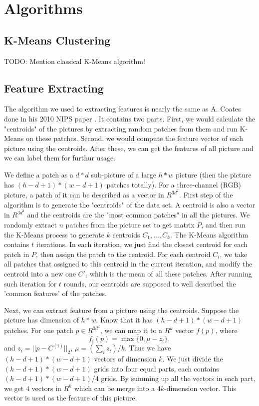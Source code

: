 \documentclass[12pt,abstract=true]{scrartcl}
\numberwithin{equation}{section}
\theoremstyle{definition}   \newtheorem{definition}{Definition}[section]
\theoremstyle{plain}        \newtheorem{theorem}{Theorem}[section]
\theoremstyle{plain}        \newtheorem{observation}{Observation}[section]
\theoremstyle{plain}        \newtheorem{fact}{Fact}[section]
\theoremstyle{plain}        \newtheorem{claim}{Claim}[section]
\theoremstyle{plain}        \newtheorem{lemma}[theorem]{Lemma}
\theoremstyle{plain}        \newtheorem{corollary}[theorem]{Corollary}
\theoremstyle{remark}       \newtheorem{example}{Example}[section]
\theoremstyle{remark}       \newtheorem{remark}{Remark}[section]
\begin{document}
\section{Algorithms}

	\subsection{K-Means Clustering}
		{\color{red}TODO: Mention classical K-Means algorithm!}
	
	\subsection{Feature Extracting}
		The algorithm we used to extracting features is nearly the same
			as A. Coates done in his 2010 NIPS paper \cite{singlelayer}.
		It contains two parts.
		First, we would calculate the "centroids" of the pictures by extracting
			random patches from them and run K-Means on these patches.
		Second, we would compute the feature vector of each picture using the centroids.
		After these, we can get the features of all picture and we can label them for furthur usage.

		We define a patch as a $d*d$ sub-picture of a large $h*w$ picture
			(then the picture has $(h-d+1)*(w-d+1)$ patches totally).
		For a three-channel (RGB) picture, a patch of it can be described as a vector in $R^{3d^2}$.
		First step of the algorithm is to generate the "centroids" of the data set.
		A centroid is also a vector in $R^{3d^2}$ and the centroids are the
			"most common patches" in all the pictures.
		We randomly extract $n$ patches from the picture set to get matrix $P$,
			and then run the K-Means process to generate $k$ centroids $C_1,...,C_k$.
		The K-Means algorithm contains $t$ iterations.
		In each iteration, we just find the closest centroid for each patch in $P$,
			then assign the patch to the centroid.
		For each centroid $C_i$,
			we take all patches that assigned to this centroid in the current iteration,
			and modify the centroid into a new one $C'_i$ which is the mean of all these patches.
		After running such iteration for $t$ rounds,
			our centroids are supposed to well described the 'common features' of the patches.

		Next, we can extract feature from a picture using the centroids.
		Suppose the picture has dimension of $h*w$.
		Know that it has $(h-d+1)*(w-d+1)$ patches.
		For one patch $p\in R^{3d^2}$, we can map it to a $R^k$ vector $f(p)$,
		where
			$$ f_i(p) = \max \{0, \mu - z_i\}, $$
		and $z_i = ||p-C^{(i)}||_2$, $\mu = (\sum_i z_i) / k$.
		Thus we have $(h-d+1)*(w-d+1)$ vectors of dimension $k$.
		We just divide the $(h-d+1)*(w-d+1)$ grids into four equal parts,
			each contains $(h-d+1)*(w-d+1)/4$ grids.
		By summing up all the vectors in each part,
			we get $4$ vectors in $R^k$ which can be merge into a $4k$-dimension vector.
		This vector is used as the feature of this picture.
	
\end{document}
